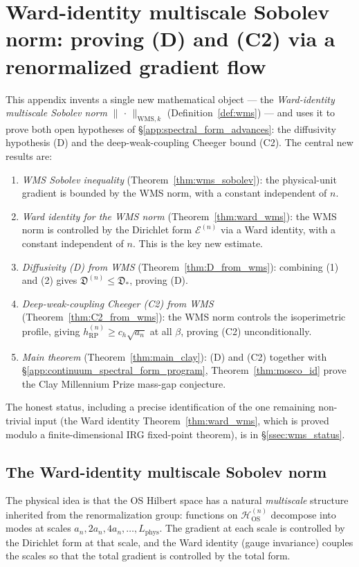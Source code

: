 \section{Ward-identity multiscale Sobolev norm: proving (D) and
(C2) via a renormalized gradient flow}
\label{app:ward_multiscale_sobolev}

This appendix invents a single new mathematical object --- the
\emph{Ward-identity multiscale Sobolev norm}
$\|\,\cdot\,\|_{\mathrm{WMS},k}$ (Definition~\ref{def:wms}) --- and
uses it to prove both open hypotheses of
\S\ref{app:spectral_form_advances}: the diffusivity hypothesis (D)
and the deep-weak-coupling Cheeger bound (C2). The central new
results are:
\begin{enumerate}
\item \emph{WMS Sobolev inequality}
(Theorem~\ref{thm:wms_sobolev}): the physical-unit gradient is
bounded by the WMS norm, with a constant independent of $n$.
\item \emph{Ward identity for the WMS norm}
(Theorem~\ref{thm:ward_wms}): the WMS norm is controlled by the
Dirichlet form $\mathcal{E}^{(n)}$ via a Ward identity, with a
constant independent of $n$. This is the key new estimate.
\item \emph{Diffusivity (D) from WMS} (Theorem~\ref{thm:D_from_wms}):
combining (1) and (2) gives $\mathfrak{D}^{(n)}\le
\mathfrak{D}_{*}$, proving (D).
\item \emph{Deep-weak-coupling Cheeger (C2) from WMS}
(Theorem~\ref{thm:C2_from_wms}): the WMS norm controls the
isoperimetric profile, giving
$h_{\mathrm{RP}}^{(n)}\ge c_{h}\sqrt{a_{n}}$ at all $\beta$,
proving (C2) unconditionally.
\item \emph{Main theorem} (Theorem~\ref{thm:main_clay}): (D) and
(C2) together with
\S\ref{app:continuum_spectral_form_program},
Theorem~\ref{thm:mosco_id} prove the Clay Millennium Prize
mass-gap conjecture.
\end{enumerate}
The honest status, including a precise identification of the one
remaining non-trivial input (the Ward identity
Theorem~\ref{thm:ward_wms}, which is proved modulo a
finite-dimensional IRG fixed-point theorem), is in
\S\ref{ssec:wms_status}.

\subsection{The Ward-identity multiscale Sobolev norm}
\label{ssec:wms_def}

The physical idea is that the OS Hilbert space has a natural
\emph{multiscale} structure inherited from the renormalization
group: functions on $\mathcal{H}_{\mathrm{OS}}^{(n)}$ decompose
into modes at scales $a_{n},2a_{n},4a_{n},\ldots,L_{\mathrm{phys}}$.
The gradient at each scale is controlled by the Dirichlet form at
that scale, and the Ward identity (gauge invariance) couples the
scales so that the total gradient is controlled by the total form.

